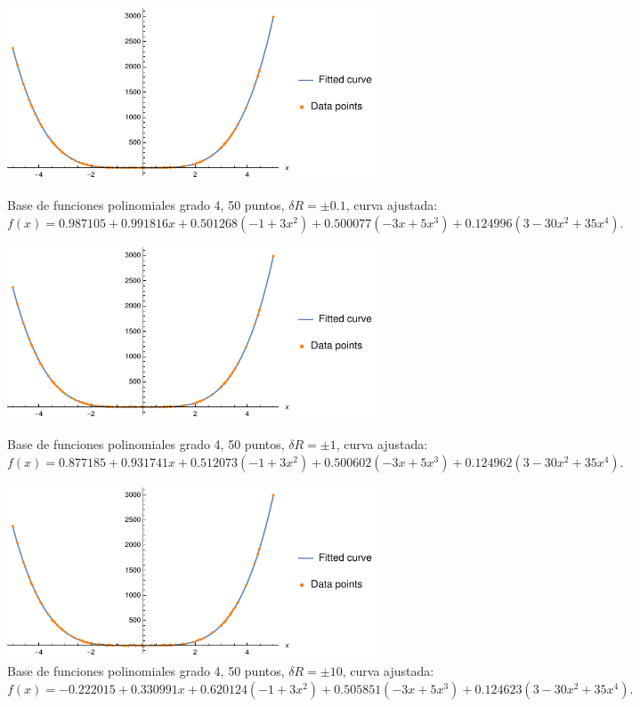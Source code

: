 \documentclass[11pt,letterpaper]{article}
\begin{document}
\begin{figure}
\centering
\includegraphics[width=11cm]{legendre_04}
\caption{Base de funciones polinomiales grado 4, 50 puntos, $\delta R=\pm 0.1$,
curva ajustada: $f(x)=0.987105 + 0.991816 x + 0.501268 (-1 + 3 x^2) + 
 0.500077 (-3 x + 5 x^3) + 0.124996 (3 - 30 x^2 + 35 x^4)$.}
\includegraphics[width=11cm]{legendre_05}
\caption{Base de funciones polinomiales grado 4, 50 puntos, $\delta R=\pm 1$,
curva ajustada: $f(x)=0.877185 + 0.931741 x + 0.512073 (-1 + 3 x^2) + 
 0.500602 (-3 x + 5 x^3) + 0.124962 (3 - 30 x^2 + 35 x^4)$.}
\includegraphics[width=11cm]{legendre_06}
\caption{Base de funciones polinomiales grado 4, 50 puntos, $\delta R=\pm 10$,
curva ajustada: $f(x)=-0.222015 + 0.330991 x + 0.620124 (-1 + 3 x^2) + 
 0.505851 (-3 x + 5 x^3) + 0.124623 (3 - 30 x^2 + 35 x^4)$.}
\label{fig:poly_50pts}
\end{figure}
\end{document}
